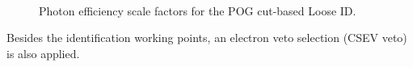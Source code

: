 \begin{figure}
  \\
  \caption{Photon efficiency scale factors for the POG cut-based Loose ID.}
  \label{fig:phEffSF}
\end{figure}

Besides the identification working points, an electron veto selection (CSEV veto) is also applied.



